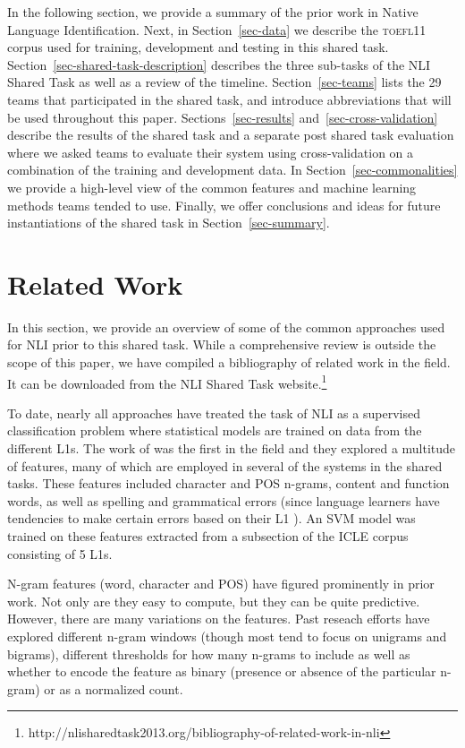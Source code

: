 \documentclass[11pt,letterpaper]{article}
\begin{document}
In the following section, we provide a summary of the prior work in
Native Language Identification.  Next, in Section~\ref{sec-data} we describe
the \textsc{toefl11} corpus used for training, development and testing in
this shared task. Section~\ref{sec-shared-task-description} describes the
three sub-tasks of the NLI Shared Task as well as a review of the timeline.
Section~\ref{sec-teams} lists the 29 teams that participated
in the shared task, and introduce abbreviations that will be used throughout this paper.  Sections~\ref{sec-results}
and~\ref{sec-cross-validation} describe the results of the shared task and a
separate post shared task evaluation where we asked teams to evaluate their
system using cross-validation on a combination of the training and development data.  In
Section~\ref{sec-commonalities} we provide a high-level view of the common
features and machine learning methods teams tended to use.  Finally,
we offer conclusions and ideas for future instantiations of the shared task
in Section~\ref{sec-summary}.

\section{Related Work}
\label{sec-relatedwork}

In this section, we provide an overview of some of the common
approaches used for NLI prior to this shared task.  While a
comprehensive review is outside the scope of this paper, we have compiled a
bibliography of related work in the field. It can be downloaded
from the NLI Shared Task website.\footnote{http://nlisharedtask2013.org/bibliography-of-related-work-in-nli}

To date, nearly all approaches have treated the task of NLI as a
supervised classification problem where statistical models are trained on
data from the different L1s.  The work of 
was the first in the field and they explored a multitude of features, many
of which are employed in several of the systems in the shared tasks.  These
features included character and POS n-grams, content and function words,
as well as spelling and grammatical errors (since language learners have
tendencies to make certain errors based on their L1 \cite{SwanSmith01}).
An SVM model was trained on these features extracted from a subsection of
the ICLE corpus consisting of 5 L1s.

N-gram features (word, character and POS)  have figured
prominently in prior work.  Not only are they
easy to compute, but they can be quite predictive.  However, there are
many variations on the features.  Past reseach efforts have explored
different n-gram windows (though most tend to focus on unigrams and bigrams), different thresholds for how many n-grams
to include as well as whether to encode the feature as binary (presence
or absence of the particular n-gram) or as a normalized count.
\end{document}
